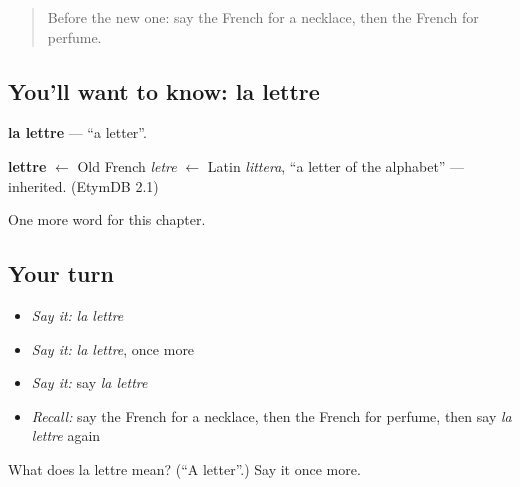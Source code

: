 \label{lesson:FR-C118-lettre}



\begin{quote}
Before the new one: say the French for a necklace, then the French for perfume.
\end{quote}

\subsection*{You'll want to know: la lettre}
\textbf{la lettre} — \textquotedblleft{}a letter\textquotedblright{}.

\begin{cousinweb}
\textbf{lettre} $\leftarrow$ Old French \emph{letre} $\leftarrow$ Latin \emph{littera}, \textquotedblleft{}a letter of the alphabet\textquotedblright{} — inherited. (EtymDB 2.1)
\end{cousinweb}

\begin{grammarlens}[title={What you've built}]
One more word for this chapter.
\end{grammarlens}

\subsection*{Your turn}
\begin{itemize}
\raggedright
  \item \emph{Say it:} \emph{la lettre}
  \item \emph{Say it:} \emph{la lettre}, once more
  \item \emph{Say it:} say \emph{la lettre}
  \item \emph{Recall:} say the French for a necklace, then the French for perfume, then say \emph{la lettre} again
\end{itemize}

\begin{tcolorbox}[breakable,colback=teal!4,colframe=teal!35!black,title={Before you move on}]
What does la lettre mean? (\textquotedblleft{}A letter\textquotedblright{}.) Say it once more.
\end{tcolorbox}
